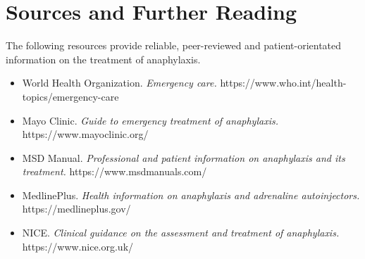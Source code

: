 \section*{Sources and Further Reading}
The following resources provide reliable, peer-reviewed and patient-orientated information on the treatment of anaphylaxis.

\begin{itemize}
    \item World Health Organization. \textit{Emergency care.} https://www.who.int/health-topics/emergency-care
    \item Mayo Clinic. \textit{Guide to emergency treatment of anaphylaxis.} https://www.mayoclinic.org/
    \item MSD Manual. \textit{Professional and patient information on anaphylaxis and its treatment.} https://www.msdmanuals.com/
    \item MedlinePlus. \textit{Health information on anaphylaxis and adrenaline autoinjectors.} https://medlineplus.gov/
    \item NICE. \textit{Clinical guidance on the assessment and treatment of anaphylaxis.} https://www.nice.org.uk/
\end{itemize}
